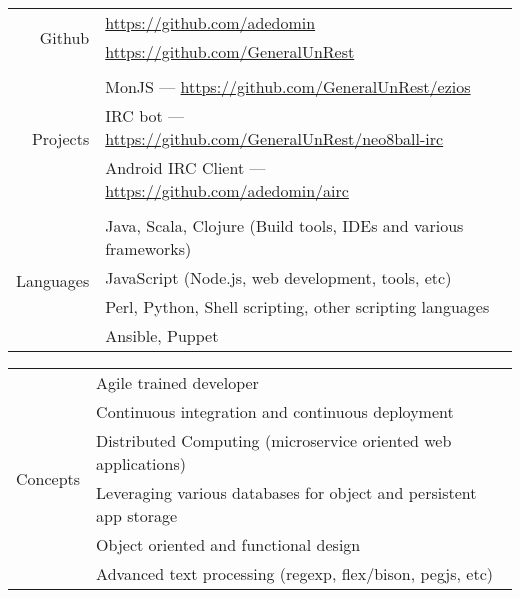 \documentclass[9pt,letterpaper,]{article}
\begin{document}
\begin{center}
\begin{tabular}{r|l}
    \multirow{2}{*}{Github} & \href{https://github.com/adedomin}{https://github.com/adedomin} \\
                            & \href{https://github.com/GeneralUnRest}{https://github.com/GeneralUnRest} \\
    \\
    \multirow{3}{*}{Projects} & MonJS --- \href{https://github.com/GeneralUnRest/ezios}{https://github.com/GeneralUnRest/ezios} \\
                              & IRC bot --- \href{https://github.com/GeneralUnRest/neo8ball-irc}{https://github.com/GeneralUnRest/neo8ball-irc} \\

                              & Android IRC Client --- \href{https://github.com/adedomin/airc}{https://github.com/adedomin/airc} \\
    \\
    \multirow{4}{*}{Languages} & Java, Scala, Clojure (Build tools, IDEs and various frameworks) \\
                               & JavaScript (Node.js, web development, tools, etc) \\
                               & Perl, Python, Shell scripting, other scripting languages \\
                               & Ansible, Puppet \\
\end{tabular} 
\end{center}
\begin{center}
\begin{tabular}{r|l}
    \multirow{6}{*}{Concepts} & Agile trained developer \\
                              & Continuous integration and continuous deployment \\
                              & Distributed Computing (microservice oriented web applications) \\
                              & Leveraging various databases for object and persistent app storage \\
                              & Object oriented and functional design \\
                              & Advanced text processing (regexp, flex/bison, pegjs, etc) \\
\end{tabular}
\end{center}
\end{document}
